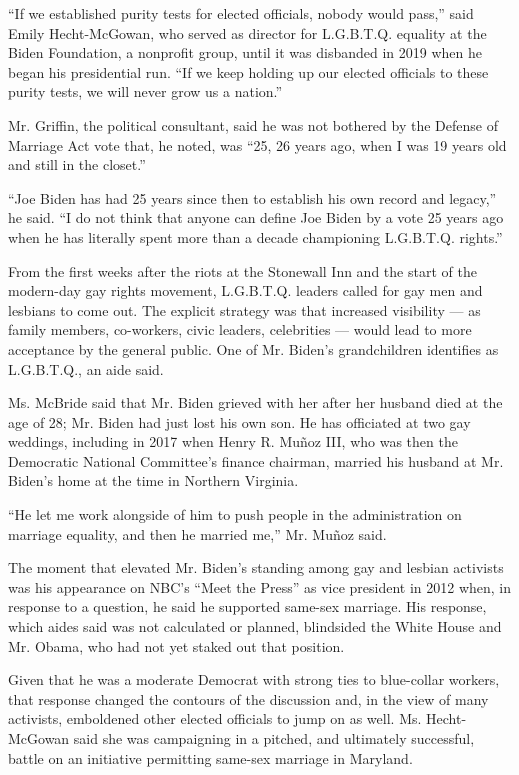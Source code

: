 ``If we established purity tests for elected officials, nobody would
pass,'' said Emily Hecht-McGowan, who served as director for L.G.B.T.Q.
equality at the Biden Foundation, a nonprofit group, until it was
disbanded in 2019 when he began his presidential run. ``If we keep
holding up our elected officials to these purity tests, we will never
grow us a nation.''

Mr. Griffin, the political consultant, said he was not bothered by the
Defense of Marriage Act vote that, he noted, was ``25, 26 years ago,
when I was 19 years old and still in the closet.''

``Joe Biden has had 25 years since then to establish his own record and
legacy,'' he said. ``I do not think that anyone can define Joe Biden by
a vote 25 years ago when he has literally spent more than a decade
championing L.G.B.T.Q. rights.''

From the first weeks after the riots at the Stonewall Inn and the start
of the modern-day gay rights movement, L.G.B.T.Q. leaders called for gay
men and lesbians to come out. The explicit strategy was that increased
visibility --- as family members, co-workers, civic leaders, celebrities
--- would lead to more acceptance by the general public. One of Mr.
Biden's grandchildren identifies as L.G.B.T.Q., an aide said.

Ms. McBride said that Mr. Biden grieved with her after her husband died
at the age of 28; Mr. Biden had just lost his own son. He has officiated
at two gay weddings, including in 2017 when Henry R. Muñoz III, who was
then the Democratic National Committee's finance chairman, married his
husband at Mr. Biden's home at the time in Northern Virginia.

``He let me work alongside of him to push people in the administration
on marriage equality, and then he married me,'' Mr. Muñoz said.

The moment that elevated Mr. Biden's standing among gay and lesbian
activists was his appearance on NBC's ``Meet the Press'' as vice
president in 2012 when, in response to a question, he said he supported
same-sex marriage. His response, which aides said was not calculated or
planned, blindsided the White House and Mr. Obama, who had not yet
staked out that position.

Given that he was a moderate Democrat with strong ties to blue-collar
workers, that response changed the contours of the discussion and, in
the view of many activists, emboldened other elected officials to jump
on as well. Ms. Hecht-McGowan said she was campaigning in a pitched, and
ultimately successful, battle on an initiative permitting same-sex
marriage in Maryland.

